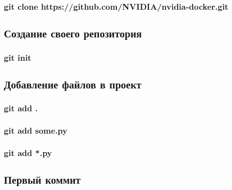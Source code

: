 \documentclass[11pt]{article}
\begin{document}
\hypertarget{git-clone-httpsgithub.comnvidianvidia-docker.git}{%
\subsubsection{git clone
https://github.com/NVIDIA/nvidia-docker.git}\label{git-clone-httpsgithub.comnvidianvidia-docker.git}}

    \hypertarget{ux441ux43eux437ux434ux430ux43dux438ux435-ux441ux432ux43eux435ux433ux43e-ux440ux435ux43fux43eux437ux438ux442ux43eux440ux438ux44f}{%
\subsection{Создание своего
репозитория}\label{ux441ux43eux437ux434ux430ux43dux438ux435-ux441ux432ux43eux435ux433ux43e-ux440ux435ux43fux43eux437ux438ux442ux43eux440ux438ux44f}}

\hypertarget{git-init}{%
\subsubsection{git init}\label{git-init}}

    \hypertarget{ux434ux43eux431ux430ux432ux43bux435ux43dux438ux435-ux444ux430ux439ux43bux43eux432-ux432-ux43fux440ux43eux435ux43aux442}{%
\subsection{Добавление файлов в
проект}\label{ux434ux43eux431ux430ux432ux43bux435ux43dux438ux435-ux444ux430ux439ux43bux43eux432-ux432-ux43fux440ux43eux435ux43aux442}}

\hypertarget{git-add-.}{%
\subsubsection{git add .}\label{git-add-.}}

\hypertarget{git-add-some.py}{%
\subsubsection{git add some.py}\label{git-add-some.py}}

\hypertarget{git-add-.py}{%
\subsubsection{git add *.py}\label{git-add-.py}}

    \hypertarget{ux43fux435ux440ux432ux44bux439-ux43aux43eux43cux43cux438ux442}{%
\subsection{Первый
коммит}\label{ux43fux435ux440ux432ux44bux439-ux43aux43eux43cux43cux438ux442}}
\end{document}
